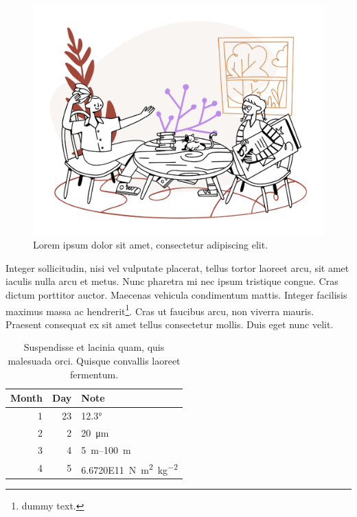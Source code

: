 \begin{figure}[tbp]
  \centering
  \includegraphics[width=0.65\linewidth]{figs/fig1.pdf}
  \caption[Lorem ipsum dolor sit amet, consectetur adipiscing elit.]
  {Lorem ipsum dolor sit amet, consectetur adipiscing elit.\protect \footnotemark}
  \label{fig:chat}
\end{figure}

Integer sollicitudin, nisi vel vulputate placerat,
tellus tortor laoreet arcu, sit amet iaculis nulla arcu et metus.
Nunc pharetra mi nec ipsum tristique congue.
Cras dictum porttitor auctor. Maecenas vehicula condimentum mattis.
Integer facilisis maximus massa ac hendrerit\footnote{dummy text.}.
Cras ut faucibus arcu, non viverra mauris.
Praesent consequat ex sit amet tellus consectetur mollis. Duis eget nunc velit.

\begin{table}[tbp]
  \small  %
  \centering
  \caption{Suspendisse et lacinia quam, quis malesuada orci.
  Quisque convallis laoreet fermentum. }
  \label{tab:monthday}
  \begin{tabular}{@{}rrl@{}}
  \toprule
  Month & Day & Note                                                \\ \midrule
  1     & 23  & \ang{12.3}                                          \\
  2     & 2   & \SI{20}{\um}                                        \\
  3     & 4   & \SIrange{5}{100}{m}                                 \\
  4     & 5   & \SI{6.6720E11}{\newton\meter^2\per\square\kilogram} \\ \bottomrule
  \end{tabular}
\end{table}

